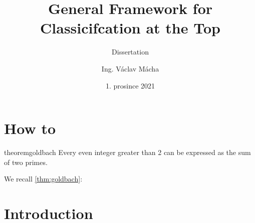 \documentclass{Thesis}
\title{General Framework for Classicifcation at the Top}
\subtitle{Dissertation}
\author{Ing. Václav Mácha}
\date{1. prosince 2021}
\begin{document}
\maketitle

\chapter{How to}

\begin{restatable}{theorem}{goldbach}\label{thm:goldbach}
  Every even integer greater than 2 can be expressed as the sum of two primes.
\end{restatable}
  
We recall \ref{thm:goldbach}:

\goldbach*

\chapter{Introduction}
\end{document}
